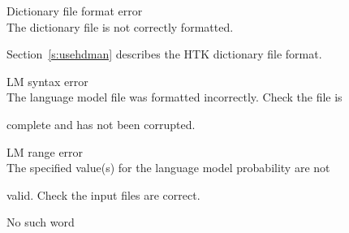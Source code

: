 \begin{itemize}
\begin{itemize}
\end{itemize}










\begin{itemize}


    Dictionary file format error\\


        The dictionary file is not correctly formatted.  


        Section~\ref{s:usehdman} describes the HTK dictionary file format.





\end{itemize}










\begin{itemize}


    LM syntax error\\


        The language model file was formatted incorrectly.  Check the file is


        complete and has not been corrupted.





 LM range error\\


        The specified value(s) for the language model probability are not 


        valid.  Check the input files are correct.





\end{itemize}










\begin{itemize}


    No such word\\



\end{itemize}
\end{itemize}
